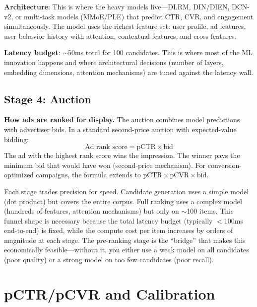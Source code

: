 \textbf{Architecture}: This is where the heavy models live---DLRM, DIN/DIEN, DCN-v2, or multi-task models (MMoE/PLE) that predict CTR, CVR, and engagement simultaneously. The model uses the richest feature set: user profile, ad features, user behavior history with attention, contextual features, and cross-features.

\textbf{Latency budget}: $\sim$50ms total for 100 candidates. This is where most of the ML innovation happens and where architectural decisions (number of layers, embedding dimensions, attention mechanisms) are tuned against the latency wall.

\subsection{Stage 4: Auction}

\textbf{How ads are ranked for display.} The auction combines model predictions with advertiser bids. In a standard second-price auction with expected-value bidding:
\begin{equation}
\text{Ad rank score} = \text{pCTR} \times \text{bid}
\end{equation}
The ad with the highest rank score wins the impression. The winner pays the minimum bid that would have won (second-price mechanism). For conversion-optimized campaigns, the formula extends to $\text{pCTR} \times \text{pCVR} \times \text{bid}$.

\begin{keyinsight}
Each stage trades precision for speed. Candidate generation uses a simple model (dot product) but covers the entire corpus. Full ranking uses a complex model (hundreds of features, attention mechanisms) but only on $\sim$100 items. This funnel shape is necessary because the total latency budget (typically $<$100ms end-to-end) is fixed, while the compute cost per item increases by orders of magnitude at each stage. The pre-ranking stage is the ``bridge'' that makes this economically feasible---without it, you either use a weak model on all candidates (poor quality) or a strong model on too few candidates (poor recall).
\end{keyinsight}

\section{pCTR/pCVR and Calibration}
\label{sec:calibration}

